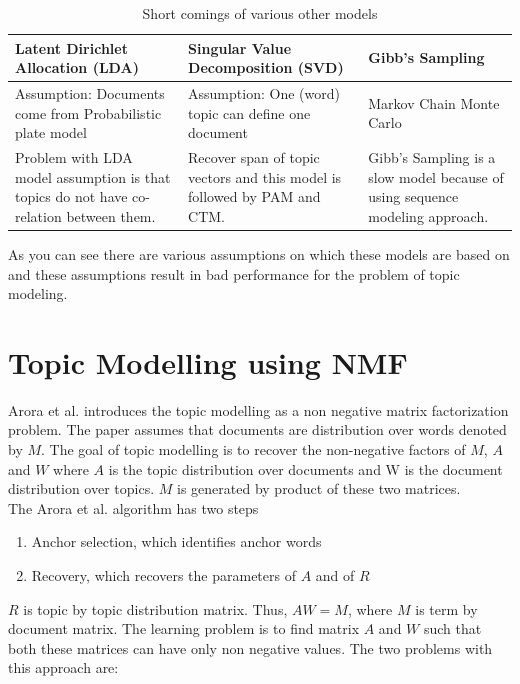 \documentclass[a4paper,11pt]{article}
\begin{document}
\begin{table}
    \begin{tabular}{ | p{6cm} | p{5.5cm} | p{4cm}  |}
    \hline
    Latent Dirichlet Allocation (LDA) & Singular Value Decomposition (SVD) & Gibb's Sampling  \\ \hline \hline
   Assumption:  Documents come from Probabilistic plate model & Assumption: One (word) topic can define one document & Markov Chain Monte Carlo  \\ \hline 
    Problem with LDA model assumption is that topics do not have co-relation between them. & Recover span of topic vectors and this model is followed by PAM and CTM. & Gibb's Sampling is a slow model because of using sequence modeling approach. \\ \hline
    \end{tabular}
    \caption {Short comings of various other models}
\end{table}

As you can see there are various assumptions on which these models are based on and these assumptions result in bad performance for the problem of topic modeling.


\section{Topic Modelling using NMF}
Arora et al. \cite{tm} introduces the topic modelling as a non negative matrix factorization problem. The paper assumes that documents are distribution over words denoted by $M$. The goal of topic modelling is to recover the non-negative factors of $M$, $A$ and $W$ where $A$ is the topic distribution over documents and W is the document distribution over topics. $M$ is generated by product of these two matrices.\\

The Arora et al. \cite{tm} algorithm has two steps

\begin{enumerate}
\item Anchor selection, which identifies anchor words
\item Recovery, which recovers the parameters of $A$ and of $R$
\end{enumerate}  

$R$ is topic by topic distribution matrix. Thus, $AW = M$, where $M$ is term by document matrix. The learning problem is to find matrix $A$ and $W$ such that both these matrices can have only non negative values. The two problems with this approach are: \\
\end{document}
